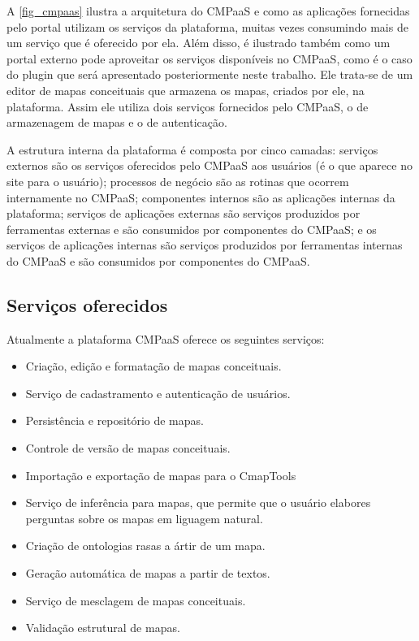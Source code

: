 \documentclass[
	12pt,				%
	openright,			%
	oneside,			%
	a4paper,			%
	english,			%
	french,				%
	spanish,			%
	brazil				%
	]{abntex2}
\begin{document}
A \autoref{fig_cmpaas} ilustra a arquitetura do CMPaaS e como as aplicações fornecidas pelo portal utilizam os serviços da plataforma, muitas vezes consumindo mais de um serviço que é oferecido por ela. Além disso, é ilustrado também como um portal externo pode aproveitar os serviços disponíveis no CMPaaS, como é o caso do plugin que será apresentado posteriormente neste trabalho. Ele trata-se de um editor de mapas conceituais que armazena os mapas, criados por ele, na plataforma. Assim ele utiliza dois serviços fornecidos pelo CMPaaS, o de armazenagem de mapas e o de autenticação.

A estrutura interna da plataforma é composta por cinco camadas: serviços externos são os serviços oferecidos pelo CMPaaS aos usuários (é o que aparece no site para o usuário); processos de negócio são as rotinas que ocorrem internamente no CMPaaS; componentes internos são as aplicações internas da plataforma; serviços de aplicações externas são serviços produzidos por ferramentas externas e são consumidos por componentes do CMPaaS; e os serviços de aplicações internas são serviços produzidos por ferramentas internas do CMPaaS e são consumidos por componentes do CMPaaS.

\subsection{Serviços oferecidos}

Atualmente a plataforma CMPaaS oferece os seguintes serviços:

\begin{itemize}
	\item Criação, edição e formatação de mapas conceituais.
	\item Serviço de cadastramento e autenticação de usuários.
	\item Persistência e repositório de mapas.
	\item Controle de versão de mapas conceituais.
	\item Importação e exportação de mapas para o CmapTools
	\item Serviço de inferência para mapas, que permite que o usuário elabores perguntas sobre os mapas em liguagem natural.
	\item Criação de ontologias rasas a ártir de um mapa.
	\item Geração automática de mapas a partir de textos.
	\item Serviço de mesclagem de mapas conceituais.
	\item Validação estrutural de mapas.
\end{itemize} 
\end{document}
